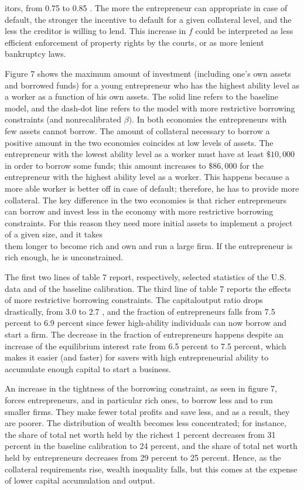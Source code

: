 \documentclass[10pt]{article}
\begin{document}
itors, from 0.75 to 0.85 . The more the entrepreneur can appropriate in case of default, the stronger the incentive to default for a given collateral level, and the less the creditor is willing to lend. This increase in $f$ could be interpreted as less efficient enforcement of property rights by the courts, or as more lenient bankruptcy laws.

Figure 7 shows the maximum amount of investment (including one's own assets and borrowed funds) for a young entrepreneur who has the highest ability level as a worker as a function of his own assets. The solid line refers to the baseline model, and the dash-dot line refers to the model with more restrictive borrowing constraints (and nonrecalibrated $\beta)$. In both economies the entrepreneurs with few assets cannot borrow. The amount of collateral necessary to borrow a positive amount in the two economies coincides at low levels of assets. The entrepreneur with the lowest ability level as a worker must have at least $\$ 10,000$ in order to borrow some funds; this amount increases to $\$ 86,000$ for the entrepreneur with the highest ability level as a worker. This happens because a more able worker is better off in case of default; therefore, he has to provide more collateral. The key difference in the two economies is that richer entrepreneurs can borrow and invest less in the economy with more restrictive borrowing constraints. For this reason they need more initial assets to implement a project of a given size, and it takes\\
them longer to become rich and own and run a large firm. If the entrepreneur is rich enough, he is unconstrained.

The first two lines of table 7 report, respectively, selected statistics of the U.S. data and of the baseline calibration. The third line of table 7 reports the effects of more restrictive borrowing constraints. The capitaloutput ratio drops drastically, from 3.0 to 2.7 , and the fraction of entrepreneurs falls from 7.5 percent to 6.9 percent since fewer high-ability individuals can now borrow and start a firm. The decrease in the fraction of entrepreneurs happens despite an increase of the equilibrium interest rate from 6.5 percent to 7.5 percent, which makes it easier (and faster) for savers with high entrepreneurial ability to accumulate enough capital to start a business.

An increase in the tightness of the borrowing constraint, as seen in figure 7, forces entrepreneurs, and in particular rich ones, to borrow less and to run smaller firms. They make fewer total profits and save less, and as a result, they are poorer. The distribution of wealth becomes less concentrated; for instance, the share of total net worth held by the richest 1 percent decreases from 31 percent in the baseline calibration to 24 percent, and the share of total net worth held by entrepreneurs decreases from 29 percent to 25 percent. Hence, as the collateral requirements rise, wealth inequality falls, but this comes at the expense of lower capital accumulation and output.
\end{document}
